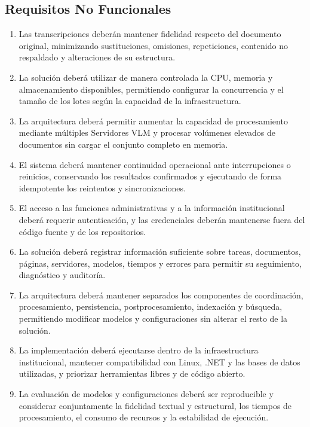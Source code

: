 \subsection{Requisitos No Funcionales}

\begin{enumerate}

    \item[\textbf{RNF-01}] Las transcripciones deberán mantener fidelidad respecto
    del documento original, minimizando sustituciones, omisiones, repeticiones,
    contenido no respaldado y alteraciones de su estructura.

    \item[\textbf{RNF-02}] La solución deberá utilizar de manera controlada la CPU,
    memoria y almacenamiento disponibles, permitiendo configurar la concurrencia
    y el tamaño de los lotes según la capacidad de la infraestructura.

    \item[\textbf{RNF-03}] La arquitectura deberá permitir aumentar la capacidad
    de procesamiento mediante múltiples Servidores VLM y procesar volúmenes
    elevados de documentos sin cargar el conjunto completo en memoria.

    \item[\textbf{RNF-04}] El sistema deberá mantener continuidad operacional ante
    interrupciones o reinicios, conservando los resultados confirmados y
    ejecutando de forma idempotente los reintentos y sincronizaciones.

    \item[\textbf{RNF-05}] El acceso a las funciones administrativas y a la
    información institucional deberá requerir autenticación, y las credenciales
    deberán mantenerse fuera del código fuente y de los repositorios.

    \item[\textbf{RNF-06}] La solución deberá registrar información suficiente
    sobre tareas, documentos, páginas, servidores, modelos, tiempos y errores para
    permitir su seguimiento, diagnóstico y auditoría.

    \item[\textbf{RNF-07}] La arquitectura deberá mantener separados los
    componentes de coordinación, procesamiento, persistencia, postprocesamiento,
    indexación y búsqueda, permitiendo modificar modelos y configuraciones sin
    alterar el resto de la solución.

    \item[\textbf{RNF-08}] La implementación deberá ejecutarse dentro de la
    infraestructura institucional, mantener compatibilidad con Linux, .NET y las
    bases de datos utilizadas, y priorizar herramientas libres y de código abierto.

    \item[\textbf{RNF-09}] La evaluación de modelos y configuraciones deberá ser
    reproducible y considerar conjuntamente la fidelidad textual y estructural,
    los tiempos de procesamiento, el consumo de recursos y la estabilidad de
    ejecución.

\end{enumerate}

